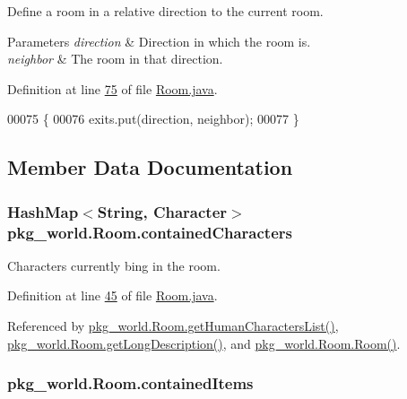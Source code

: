 Define a room in a relative direction to the current room. 


\begin{DoxyParams}{Parameters}
{\em direction} & Direction in which the room is. \\
\hline
{\em neighbor} & The room in that direction. \\
\hline
\end{DoxyParams}


Definition at line \hyperlink{Room_8java_source_l00075}{75} of file \hyperlink{Room_8java_source}{Room.\-java}.


\begin{DoxyCode}
00075                                                          \{
00076         exits.put(direction, neighbor);
00077     \}
\end{DoxyCode}


\subsection{Member Data Documentation}
\hypertarget{classpkg__world_1_1Room_a144af7eaf591c4f5ad9eaf123e628de0}{
\subsubsection[{contained\-Characters}]{\setlength{\rightskip}{0pt plus 5cm}Hash\-Map$<$String, {\bf Character}$>$ pkg\-\_\-world.\-Room.\-contained\-Characters\hspace{0.3cm}{\ttfamily [private]}}}\label{classpkg__world_1_1Room_a144af7eaf591c4f5ad9eaf123e628de0}


Characters currently bing in the room. 



Definition at line \hyperlink{Room_8java_source_l00045}{45} of file \hyperlink{Room_8java_source}{Room.\-java}.



Referenced by \hyperlink{Room_8java_source_l00179}{pkg\-\_\-world.\-Room.\-get\-Human\-Characters\-List()}, \hyperlink{Room_8java_source_l00160}{pkg\-\_\-world.\-Room.\-get\-Long\-Description()}, and \hyperlink{Room_8java_source_l00062}{pkg\-\_\-world.\-Room.\-Room()}.

\hypertarget{classpkg__world_1_1Room_a3a9b7b85c95e41654c017e1adb74a49b}{
\subsubsection[{contained\-Items}]{ pkg\-\_\-world.\-Room.\-contained\-Items\hspace{0.3cm}{\ttfamily [private]}}}\label{classpkg__world_1_1Room_a3a9b7b85c95e41654c017e1adb74a49b}


